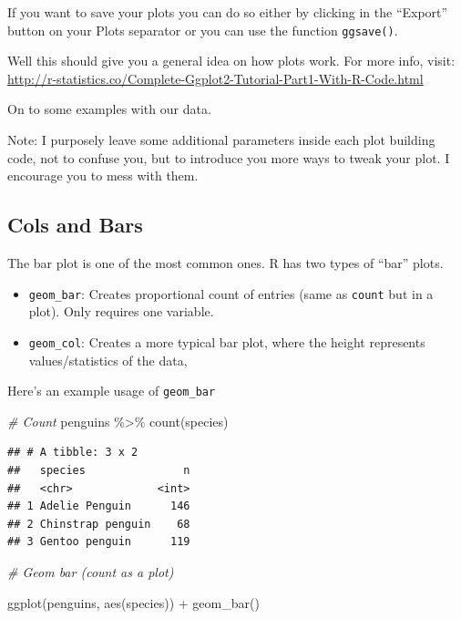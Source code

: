 \documentclass[
]{book}
\newenvironment{Shaded}{\begin{snugshade}}{\end{snugshade}}
\newcommand{\CommentTok}[1]{\textcolor[rgb]{0.56,0.35,0.01}{\textit{#1}}}
\newcommand{\FunctionTok}[1]{\textcolor[rgb]{0.00,0.00,0.00}{#1}}
\newcommand{\NormalTok}[1]{#1}
\newcommand{\SpecialCharTok}[1]{\textcolor[rgb]{0.00,0.00,0.00}{#1}}
\begin{document}
If you want to save your plots you can do so either by clicking in the ``Export'' button on your Plots separator or you can use the function \texttt{ggsave()}.

Well this should give you a general idea on how plots work.
For more info, visit: \url{http://r-statistics.co/Complete-Ggplot2-Tutorial-Part1-With-R-Code.html}

On to some examples with our data.

Note: I purposely leave some additional parameters inside each plot building code, not to confuse you, but to introduce you more ways to tweak your plot.
I encourage you to mess with them.

\hypertarget{cols-and-bars}{%
\subsection{Cols and Bars}\label{cols-and-bars}}

The bar plot is one of the most common ones.
R has two types of ``bar'' plots.

\begin{itemize}
\item
  \texttt{geom\_bar}: Creates proportional count of entries (same as \texttt{count} but in a plot).
  Only requires one variable.
\item
  \texttt{geom\_col}: Creates a more typical bar plot, where the height represents values/statistics of the data,
\end{itemize}

Here's an example usage of \texttt{geom\_bar}

\begin{Shaded}
\begin{Highlighting}[]
\CommentTok{\# Count}
\NormalTok{penguins }\SpecialCharTok{\%\textgreater{}\%} 
  \FunctionTok{count}\NormalTok{(species)}
\end{Highlighting}
\end{Shaded}

\begin{verbatim}
## # A tibble: 3 x 2
##   species               n
##   <chr>             <int>
## 1 Adelie Penguin      146
## 2 Chinstrap penguin    68
## 3 Gentoo penguin      119
\end{verbatim}

\begin{Shaded}
\begin{Highlighting}[]
\CommentTok{\# Geom bar (count as a plot)}

\FunctionTok{ggplot}\NormalTok{(penguins, }\FunctionTok{aes}\NormalTok{(species)) }\SpecialCharTok{+}
  \FunctionTok{geom\_bar}\NormalTok{() }
\end{Highlighting}
\end{Shaded}
\end{document}

